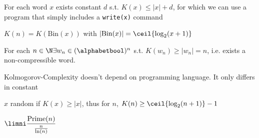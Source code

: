 \inlinelemma For each word $x$ exists constant $d$ s.t. $K(x) \leq |x| + d$, for which we can use a program that simply includes a \texttt{write(x)} command

 $K(n) = K(\text{Bin}(x))$ with $|\text{Bin}(x)| = \ceil{\log_2(x + 1)}$

\inlinelemma For each $n \in \N \exists w_n \in (\alphabetbool)^n$ s.t. $K(w_n) \geq |w_n| = n$, i.e. exists a non-compressible word.

\inlinetheorem Kolmogorov-Complexity doesn't depend on programming language. It only differs in constant

 $x$ random if $K(x) \geq |x|$, thus for $n$, $K(n) \geq \ceil{\log_2(n + 1)} - 1$

 $\displaystyle \limni \frac{\text{Prime}(n)}{\frac{n}{\ln(n)}}$
